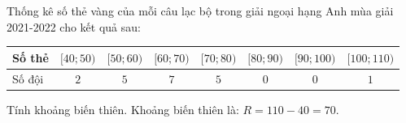 \begin{bt}%
	Thống kê số thẻ vàng của mỗi câu lạc bộ trong giải ngoại hạng Anh mùa giải 2021-2022 cho kết quả sau:
	\begin{center}
		\begin{tabular}{|l|c|c|c|c|c|c|c|}
			\hline 
			Số thẻ & $[40 ; 50)$ & $[50 ; 60)$ & $[60 ; 70)$ & $[70 ; 80)$ & $[80 ; 90)$ & $[90 ; 100)$ & $[100 ; 110)$ \\
			\hline 
			Số đội & $2$ & $5$ & $7$ & $5$ & $0$ & $0$ & $1$ \\
			\hline
		\end{tabular}
	\end{center}
	Tính khoảng biến thiên.
	\loigiai
	{
		Khoảng biến thiên là: $R=110-40=70$.
	}
\end{bt}

